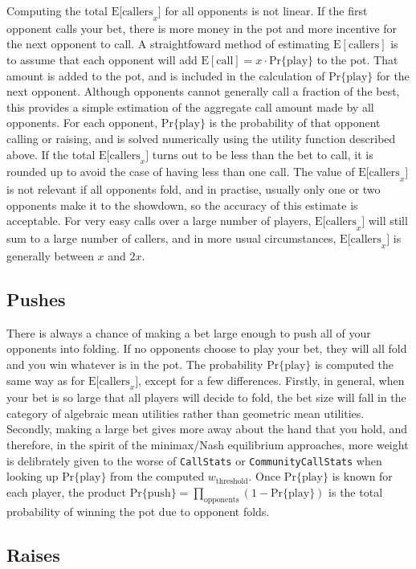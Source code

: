 Computing the total $\mathrm{E[callers}_x]$ for all opponents is not linear.
If the first opponent calls your bet, there is more money in the pot and more incentive for the next opponent to call.
A straightfoward method of estimating $\mathrm{E[callers]}$ is to assume that each opponent will add $\mathrm{E[call]} = x \cdot \mathrm{Pr\{play\}}$ to the pot.
That amount is added to the pot, and is included in the calculation of $\mathrm{Pr\{play\}}$ for the next opponent.
Although opponents cannot generally call a fraction of the best, this provides a simple estimation of the aggregate call amount made by all opponents.
For each opponent, $\mathrm{Pr\{play\}}$ is the probability of that opponent calling or raising, and is solved numerically using the utility function described above.
If the total $\mathrm{E[callers}_x]$ turns out to be less than the bet to call, it is rounded up to avoid the case of having less than one call.
The value of $\mathrm{E[callers}_x]$ is not relevant if all opponents fold, and in practise, usually only one or two opponents make it to the showdown, so the accuracy of this estimate is acceptable.
For very easy calls over a large number of players, $\mathrm{E[callers}_x]$ will still sum to a large number of callers, and in more usual circumstances, $\mathrm{E[callers}_x]$ is generally between $x$ and $2x$.


\subsection{Pushes}
\label{sec:Push}

There is always a chance of making a bet large enough to push all of your opponents into folding.
If no opponents choose to play your bet, they will all fold and you win whatever is in the pot.
The probability $\mathrm{Pr\{play\}}$ is computed the same way as for $\mathrm{E[callers}_x]$, except for a few differences.
Firstly, in general, when your bet is so large that all players will decide to fold, the bet size will fall in the category of algebraic mean utilities rather than geometric mean utilities.
Secondly, making a large bet gives more away about the hand that you hold, and therefore, in the spirit of the minimax/Nash equilibrium approaches, more weight is delibrately given to the worse of \texttt{CallStats} or \texttt{CommunityCallStats} when looking up $\mathrm{Pr\{play\}}$ from the computed $w_\mathrm{threshold}$.
Once $\mathrm{Pr\{play\}}$ is known for each player, the product $\mathrm{Pr\{push\}} = \prod_\mathrm{opponents} \left( 1 - \mathrm{Pr\{play\}} \right)$ is the total probability of winning the pot due to opponent folds.



\subsection{Raises}
\label{sec:Raises}







\clearpage
